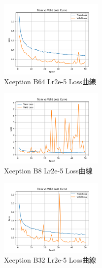 \begin{figure}[htbp]
    \centering
    \includegraphics[width=0.45\textwidth]{./img/Xception/P3.png}
    \caption{Xception B64 Lr2e-5 Loss曲線}
    \label{fig:Xception_P3}
\end{figure}
\begin{figure}[htbp]
    \centering
    \includegraphics[width=0.45\textwidth]{./img/Xception/P4.png}
    \caption{Xception B8 Lr2e-5 Loss曲線}
    \label{fig:Xception_P4}
\end{figure}
\begin{figure}[htbp]
    \centering
    \includegraphics[width=0.45\textwidth]{./img/Xception/P5.png}
    \caption{Xception B32 Lr2e-5 Loss曲線}
    \label{fig:Xception_P5}
\end{figure}
%

